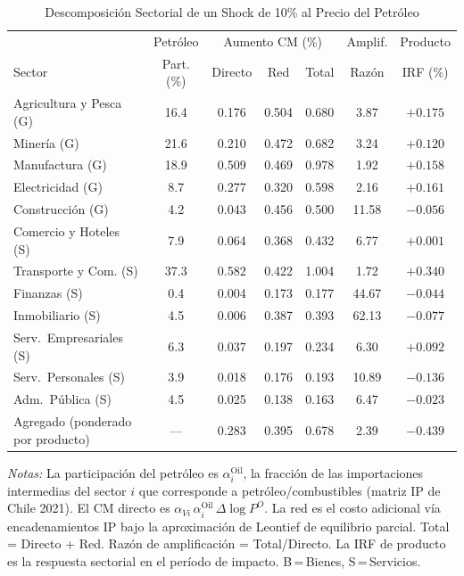 \begin{table}[htbp]
\centering
\caption{Descomposición Sectorial de un Shock de 10\% al Precio del Petróleo}
\label{tab:oil_decomp}
\begin{threeparttable}
\small
\begin{tabular}{@{}l c c c c c c@{}}
\toprule
 & Petróleo & \multicolumn{3}{c}{Aumento CM (\%)} & Amplif. & Producto \\
\cmidrule(lr){3-5}
Sector & Part. (\%) & Directo & Red & Total & Razón & IRF (\%) \\
\midrule
Agricultura y Pesca (G) & 16.4 & 0.176 & 0.504 & 0.680 &  3.87 & $+0.175$ \\
Minería (G) & 21.6 & 0.210 & 0.472 & 0.682 &  3.24 & $+0.120$ \\
Manufactura (G) & 18.9 & 0.509 & 0.469 & 0.978 &  1.92 & $+0.158$ \\
Electricidad (G) &  8.7 & 0.277 & 0.320 & 0.598 &  2.16 & $+0.161$ \\
Construcción (G) &  4.2 & 0.043 & 0.456 & 0.500 & 11.58 & $-0.056$ \\
Comercio y Hoteles (S) &  7.9 & 0.064 & 0.368 & 0.432 &  6.77 & $+0.001$ \\
Transporte y Com. (S) & 37.3 & 0.582 & 0.422 & 1.004 &  1.72 & $+0.340$ \\
Finanzas (S) &  0.4 & 0.004 & 0.173 & 0.177 & 44.67 & $-0.044$ \\
Inmobiliario (S) &  4.5 & 0.006 & 0.387 & 0.393 & 62.13 & $-0.077$ \\
Serv.\ Empresariales (S) &  6.3 & 0.037 & 0.197 & 0.234 &  6.30 & $+0.092$ \\
Serv.\ Personales (S) &  3.9 & 0.018 & 0.176 & 0.193 & 10.89 & $-0.136$ \\
Adm.\ Pública (S) &  4.5 & 0.025 & 0.138 & 0.163 &  6.47 & $-0.023$ \\
\midrule
Agregado (ponderado por producto) & --- & 0.283 & 0.395 & 0.678 &  2.39 & $-0.439$ \\
\bottomrule
\end{tabular}
\begin{tablenotes}[flushleft]
\footnotesize
\item \textit{Notas:} La participación del petróleo es $\alpha^{\text{Oil}}_i$, la fracción de las importaciones intermedias del sector $i$ que corresponde a petróleo/combustibles (matriz IP de Chile 2021). El CM directo es $\alpha_{Vi}\,\alpha^{\text{Oil}}_i\,\Delta\log P^O$. La red es el costo adicional vía encadenamientos IP bajo la aproximación de Leontief de equilibrio parcial. Total = Directo + Red. Razón de amplificación = Total/Directo. La IRF de producto es la respuesta sectorial en el período de impacto. B\,=\,Bienes, S\,=\,Servicios.
\end{tablenotes}
\end{threeparttable}
\end{table}
